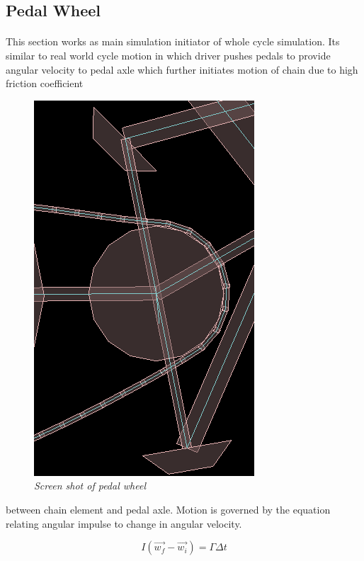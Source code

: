\documentclass[11pt]{article}
\begin{document}
\subsection{Pedal Wheel}
\paragraph{}

	This section works as main simulation initiator of whole cycle simulation. Its similar to real world cycle motion in which driver pushes
	pedals to provide angular velocity to pedal axle which further initiates motion of chain due to high friction coefficient 
	
	\begin{figure}
	  \begin{center}
		\includegraphics[scale = 0.4]{images/pedal} \\
		\emph{Screen shot of pedal wheel}
	  \end{center}
	\end{figure}

	between 
	chain element and pedal axle. Motion is governed by the equation relating angular impulse to change in angular velocity.

	\begin{equation}
		I (\vec{w_f} - \vec{w_i}) = \Gamma \Delta{t}
	\end{equation}
\end{document}
